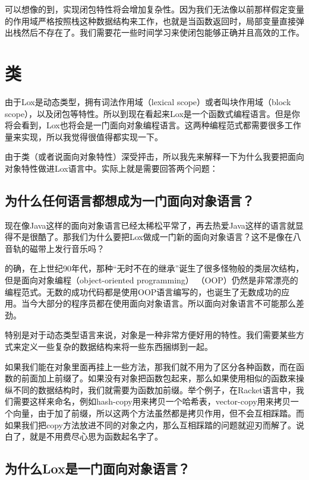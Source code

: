 \documentclass[cn,10pt,math=newtx,citestyle=gb7714-2015,bibstyle=gb7714-2015]{elegantbook}
\begin{document}
可以想像的到，实现闭包特性将会增加复杂性。因为我们无法像以前那样假定变量的作用域严格按照栈这种数据结构来工作，也就是当函数返回时，局部变量直接弹出栈然后不存在了。我们需要花一些时间学习来使闭包能够正确并且高效的工作。

\section{类}

由于Lox是动态类型，拥有词法作用域（lexical scope）或者叫块作用域（block scope），以及闭包等特性。所以到现在看起来Lox是一个函数式编程语言。但是你将会看到，Lox也将会是一门面向对象编程语言。这两种编程范式都需要很多工作量来实现，所以我觉得很值得都实现一下。

由于类（或者说面向对象特性）深受抨击，所以我先来解释一下为什么我要把面向对象特性做进Lox语言中。实际上就是需要回答两个问题：

\subsection{为什么任何语言都想成为一门面向对象语言？}

现在像Java这样的面向对象语言已经太稀松平常了，再去热爱Java这样的语言就显得不是很酷了。那我们为什么要把Lox做成一门新的面向对象语言？这不是像在八音轨的磁带上发行音乐吗？

的确，在上世纪90年代，那种“无时不在的继承”诞生了很多怪物般的类层次结构，但是面向对象编程（object-oriented programming） （OOP）仍然是非常漂亮的编程范式。无数的成功代码都是使用OOP语言编写的，也诞生了无数成功的应用。当今大部分的程序员都在使用面向对象语言。所以面向对象语言不可能那么差劲。

特别是对于动态类型语言来说，对象是一种非常方便好用的特性。我们需要某些方式来定义一些复杂的数据结构来将一些东西捆绑到一起。

如果我们能在对象里面再挂上一些方法，那我们就不用为了区分各种函数，而在函数的前面加上前缀了。如果没有对象把函数包起来，那么如果使用相似的函数来操纵不同的数据结构时，我们就需要为函数加前缀。举个例子，在Racket语言中，我们需要这样来命名，例如hash-copy用来拷贝一个哈希表，vector-copy用来拷贝一个向量，由于加了前缀，所以这两个方法虽然都是拷贝作用，但不会互相踩踏。而如果我们把copy方法放进不同的对象之内，那么互相踩踏的问题就迎刃而解了。说白了，就是不用费尽心思为函数起名字了。

\subsection{为什么Lox是一门面向对象语言？}
\end{document}
